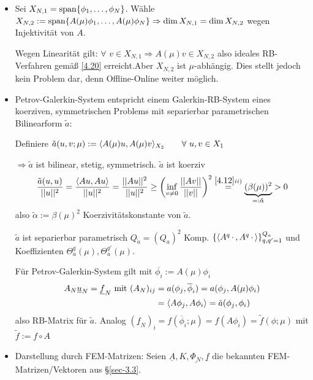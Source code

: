 \begin{bem} \beginwithlistbem
	\begin{itemize}
		\item Sei $X_{N,1} = \op{span}\{\phi_1,\dots,\phi_N\}$. Wähle $X_{N,2} := \op{span} \{A(\mu) \phi_1,\dots,A(\mu)\phi_N\} \Rightarrow \dim X_{N,1} = \dim X_{N,2}$ wegen Injektivität von $A$.
		
		Wegen Linearität gilt: $\forall \,\, v \in X_{N,1} \Rightarrow A(\mu)v \in X_{N,2}$ also ideales RB-Verfahren gemäß \ref{4.20} erreicht.Aber $X_{N,2}$ ist $\mu$-abhängig. Dies stellt jedoch kein Problem dar, denn Offline-Online weiter möglich.
		\item Petrov-Galerkin-System entspricht einem Galerkin-RB-System eines koerziven, symmetrischen Problems mit separierbar parametrischen Bilinearform $\tilde{a}$:
		
		Definiere $\tilde{a}(u,v;\mu) := \langle A(\mu)u, A(\mu)v \rangle_{X_2} \qquad \forall \,\, u,v \in X_1$
		
		$\Rightarrow \tilde{a}$ ist bilinear, stetig, symmetrisch. $\tilde{a}$ ist koerziv
		\begin{equation}
			\frac{\tilde{a}(u,u)}{||u||^2} = \frac{\langle Au, Au \rangle}{||u||^2} = \frac{||Au||^2}{||u||^2} \geq \left(\inf\limits_{v \neq 0} \frac{||Av||}{||v||} \right)^2 \overset{\ref{4.12} ii)}{=} \underbrace{(\beta(\mu))^2}_{=: \tilde\alpha} > 0 \label{eq:4.7}
		\end{equation}
		also $\tilde{\alpha} := \beta(\mu)^2$ Koerzivitätskonstante von $\tilde{a}$.
		
		$\tilde{a}$ ist separierbar parametrisch $Q_{\tilde{a}} = (Q_a)^2$ Komp.  $\{\langle A^q\,\cdot\,, A^q\,\cdot\, \rangle\}_{q,q' =1}^{Q_a}$ und Koeffizienten $\Theta_a^q(\mu), \Theta_a^{q'}(\mu)$.
		
		Für Petrov-Galerkin-System gilt mit $\overline{\phi_i} := A(\mu) \phi_i$
		\begin{align*}
		A_N \underline{u}_N = \underline{f}_N \text{ mit } (A_N)_{ij} &= a(\phi_j,\overline{\phi}_i) = a(\phi_j, A(\mu)\phi_i) \\
		&= \dotp{A\phi_j}{A\phi_i} = \tilde{a} (\phi_j,\phi_i)
		\end{align*}
		also RB-Matrix für $\tilde{a}$. Analog $(\underline{f}_N)_i = f(\overline{\phi}_i;\mu) = f(A\phi_i) = \tilde{f}(\phi;\mu)$ mit $\tilde{f} := f \circ A$
		\item Darstellung durch FEM-Matrizen: Seien $\underline{A}, K, \underline{\Phi_N}, \underline{f}$ die bekannten FEM-Matrizen/Vektoren aus §\ref{sec-3.3}.
		

\end{itemize}
\end{bem}
